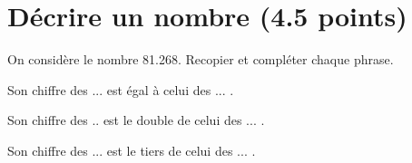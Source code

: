 \section{Décrire un nombre (4.5 points)}

On considère le nombre \num{81.268}.
Recopier et compléter chaque phrase.
\begin{questions}
	
	
	\question[1\half] Son chiffre des ... est égal à celui des ... .
	
	
	\question[1\half] Son chiffre des .. est le double de celui des ... .
	
	
	\question[1\half] Son chiffre des ... est le tiers de celui des ... .
	
	
\end{questions}


